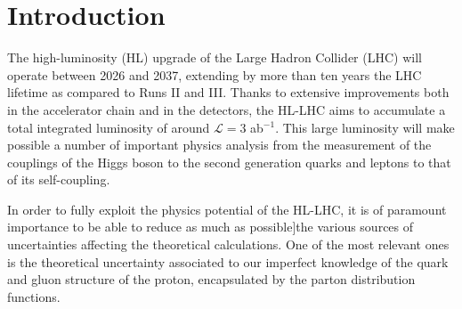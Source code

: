 \section{Introduction}
\label{sec:introduction}

The high-luminosity (HL) upgrade of the Large Hadron Collider (LHC)
will operate between 2026 and 2037, extending by more than ten years
the LHC lifetime as compared to Runs II and III.
%
Thanks to extensive improvements both in the accelerator chain and
in the detectors, the HL-LHC aims to accumulate a total
integrated luminosity of around $\mathcal{L}=3$ ab$^{-1}$.
%
This large luminosity will make possible a number of important
physics analysis from the measurement of the couplings
of the Higgs boson to the second generation quarks and leptons
to that of its self-coupling.

In order to fully exploit the physics potential of the HL-LHC,
it is of paramount importance to be able to reduce as much as possible]the
  various sources of uncertainties affecting the theoretical calculations.
  One of the most relevant ones is the theoretical uncertainty
  associated to our imperfect knowledge of the quark
  and gluon structure of the proton, encapsulated
  by the parton distribution functions.
